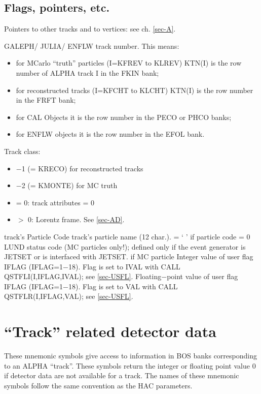\subsection{\label{sec-TVAFP}Flags, pointers, etc.}
\par
Pointers to other tracks and to vertices: see ch. \ref{sec-A}.
\begin{indentlist}{ 3.00cm}{ 3.25cm}
GALEPH/ JULIA/ ENFLW  track number.
                    This means:
\begin{itemize}
\item for MCarlo ``truth'' particles (I=KFREV to KLREV) KTN(I) is the row number of ALPHA track I in the
                    FKIN bank;
\item  for reconstructed tracks (I=KFCHT to KLCHT) KTN(I) is the row number in the FRFT bank;
\item                     for CAL Objects it is the row number in the PECO or PHCO banks; 
\item    for ENFLW objects it is the row number in the
                    EFOL bank.
\end{itemize}

Track class:
\begin{itemize}
\item  $-$1 (= KRECO) for reconstructed tracks
\item  $-$2 (= KMONTE) for MC truth
\item = 0: track attributes = 0
\item $>$ 0: Lorentz frame. See \ref{sec-AD}.
\end{itemize}
track's Particle Code
track's particle name (12 char.).
= ` ' if particle code = 0
LUND status code (MC particles only!); defined only if the event generator is JETSET or is interfaced
 with JETSET.
 if MC particle
Integer value of user flag IFLAG (IFLAG=1$-$18).
Flag is set to IVAL with CALL QSTFLI(I,IFLAG,IVAL); see
\ref{sec-USFL}.
Floating$-$point value of user flag
IFLAG (IFLAG=1$-$18).
Flag is set to VAL with CALL QSTFLR(I,IFLAG,VAL); see
\ref{sec-USFL}.
\end{indentlist}
 
\section{\label{sec-TVATRD}``Track'' related detector data}
\par
These mnemonic symbols give access to information in BOS banks
corresponding to an ALPHA ``track''.
These symbols return the integer or floating
point value 0 if detector data are not available for a track.
The names of these mnemonic
symbols follow the same convention as the HAC parameters.
 
